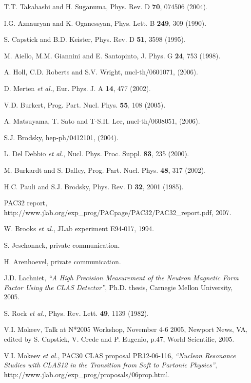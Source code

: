 \begin{thebibliography}{199}
T.T. Takahashi and H. Suganuma, Phys. Rev. D {\bf 70}, 074506 (2004).

I.G. Aznauryan and K. Oganessyan, Phys. Lett. B {\bf 249}, 309 (1990).

S. Capstick and B.D. Keister, Phys. Rev. D {\bf 51}, 3598 (1995).

M. Aiello, M.M. Giannini and E. Santopinto, J. Phys. G {\bf 24}, 753 (1998).

A. Holl, C.D. Roberts and S.V. Wright, nucl-th/0601071, (2006).

D. Merten {\it et al.}, Eur. Phys. J. A {\bf 14}, 477 (2002).

V.D. Burkert, Prog. Part. Nucl. Phys. {\bf 55}, 108 (2005).

A. Matsuyama, T. Sato and T-S.H. Lee, nucl-th/0608051, (2006).

S.J. Brodsky, hep-ph/0412101, (2004).

L. Del Debbio {\it et al.}, Nucl. Phys. Proc. Suppl. {\bf 83}, 235 (2000).

M. Burkardt and S. Dalley, Prog. Part. Nucl. Phys. {\bf 48}, 317 (2002).

H.C. Pauli and S.J. Brodsky, Phys. Rev. D {\bf 32}, 2001 (1985).

PAC32 report, http://www.jlab.org/exp\_prog/PACpage/PAC32/PAC32\_report.pdf,
2007.

W. Brooks {\it et al.}, JLab experiment E94-017, 1994.

S. Jeschonnek, private communication.

H. Arenhoevel, private communication.

J.D. Lachniet, {\it ``A High Precision Measurement of the Neutron Magnetic 
Form Factor Using the CLAS Detector''}, Ph.D. thesis, Carnegie Mellon 
University, 2005.

S. Rock {\it et al.}, Phys. Rev. Lett. {\bf 49}, 1139 (1982).

V.I. Mokeev, Talk at N*2005 Workshop, November 4-6 2005, Newport News, VA, 
edited by S. Capstick, V. Crede and P. Eugenio, p.47, World Scientific, 
2005.

V.I. Mokeev {\it et al.}, PAC30 CLAS proposal PR12-06-116, {\it ``Nucleon 
Resonance Studies with CLAS12 in the Transition from Soft to Partonic 
Physics''}, http://www.jlab.org/exp\_prog/proposals/06prop.html.


\end{thebibliography}
